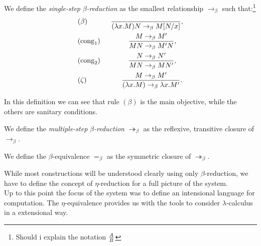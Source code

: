 \begin{definition}
  We define the \emph{single-step} $\beta$\emph{-reduction} as the smallest relationship $\to_\beta$ such that:\footnote{Should i explain the notation ${A \over B}$}
  \begin{align*}
    &(\beta) \qquad\ \ \  \ {\ \over(\lambda x.M)N \to_\beta M[N/x]},\\
    &(\operatorname{cong}_1)\qquad\qquad{ M \to_\beta M' \over MN \to_\beta M'N },\\
    &(\operatorname{cong}_2)\qquad\qquad{ N \to_\beta N' \over MN \to_\beta MN' },\\
    &(\zeta) \qquad\qquad \ \  \ {M\to_\beta M' \over(\lambda x.M) \to_\beta \lambda x.M'}.\\
  \end{align*}
\end{definition}

In this definition we can see that rule $(\beta)$ is the main objective, while the others are sanitary conditions.

\begin{definition}
We define the \emph{multiple-step} $\beta$\emph{-reduction} $\twoheadrightarrow_\beta$ as the reflexive, transitive closure of $\to_\beta$.
\end{definition}
\begin{definition}
  We define the $\beta$-equivalence $=_\beta$ as the symmetric closure of $\twoheadrightarrow_\beta$.
\end{definition}

While most constructions will be understood clearly using only $\beta$-reduction, we have to define the concept of $\eta$-reduction for a full picture of the system.\\


Up to this point the focus of the system was to define an intensional language for computation. The $\eta$-equivalence provides us with the tools to consider $\lambda$-calculus in a extensional way. \\

